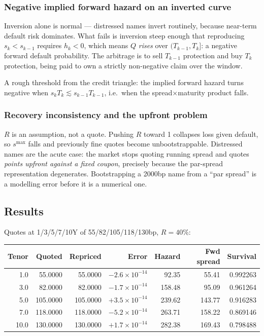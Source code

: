 \documentclass[11pt,a4paper]{article}
\begin{document}
\subsubsection*{Negative implied forward hazard on an inverted curve}

Inversion alone is normal --- distressed names invert routinely, because near-term default
risk dominates. What fails is inversion steep enough that reproducing $s_k < s_{k-1}$ requires
$h_k < 0$, which means $Q$ \emph{rises} over $(T_{k-1},T_k]$: a negative forward default
probability. The arbitrage is to sell $T_{k-1}$ protection and buy $T_k$ protection, being
paid to own a strictly non-negative claim over the window.

A rough threshold from the credit triangle: the implied forward hazard turns negative when
$s_k T_k \lesssim s_{k-1}T_{k-1}$, i.e.\ when the spread$\times$maturity product falls.

\subsubsection*{Recovery inconsistency and the upfront problem}

$R$ is an assumption, not a quote. Pushing $R$ toward 1 collapses loss given default, so
$s^{\max}$ falls and previously fine quotes become unbootstrappable. Distressed names are the
acute case: the market stops quoting running spread and quotes \emph{points upfront against a
fixed coupon}, precisely because the par-spread representation degenerates. Bootstrapping a
2000bp name from a ``par spread'' is a modelling error before it is a numerical one.

\subsection{Results}

Quotes at 1/3/5/7/10Y of 55/82/105/118/130bp, $R = 40\%$:

\begin{center}
\begin{tabular}{rrrrrrr}
\toprule
\textbf{Tenor} & \textbf{Quoted} & \textbf{Repriced} & \textbf{Error} & \textbf{Hazard} & \textbf{Fwd spread} & \textbf{Survival} \\
\midrule
1.0  & 55.0000 & 55.0000 & $-2.6\times10^{-14}$ & 92.35  & 55.41  & 0.992263 \\
3.0  & 82.0000 & 82.0000 & $-1.7\times10^{-14}$ & 158.48 & 95.09  & 0.961264 \\
5.0  & 105.0000 & 105.0000 & $+3.5\times10^{-14}$ & 239.62 & 143.77 & 0.916283 \\
7.0  & 118.0000 & 118.0000 & $-5.2\times10^{-14}$ & 263.71 & 158.22 & 0.869146 \\
10.0 & 130.0000 & 130.0000 & $+1.7\times10^{-14}$ & 282.38 & 169.43 & 0.798488 \\
\bottomrule
\end{tabular}
\end{center}
\end{document}
